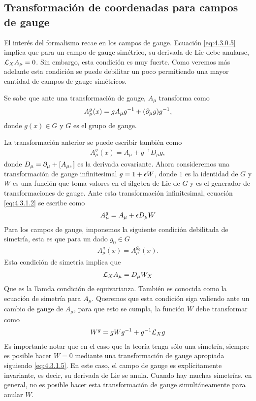 \subsection{Transformación de coordenadas para campos de gauge}

El interés del formalismo recae en los campos de gauge. Ecuación \eqref{eq:4.3.0.5} implica que para un campo de gauge simétrico, su derivada de Lie debe anularse, $\mathcal{L}_X A_\mu=0$. Sin embargo, esta condición es muy fuerte. Como veremos más adelante esta condición se puede debilitar un poco permitiendo una mayor cantidad de campos de gauge simétricos.

Se sabe que ante una transformación de gauge, $A_\mu$ transforma como
\begin{align}
	A^g_\mu(x) = gA_\mu g^{-1}+(\partial_\mu g)g^{-1}, \label{eq:4.3.1.1}
\end{align}
donde $g(x)\in G$ y $G$ es el grupo de gauge.

La transformación anterior se puede escribir también como
\begin{align}
	A^g_\mu(x) = A_\mu+g^{-1}D_\mu g, \label{eq:4.3.1.2}
\end{align}
donde $D_\mu=\partial_\mu+[A_\mu,]$ es la derivada covariante. Ahora consideremos una transformación de gauge infinitesimal $g=1+\epsilon W$, donde $1$ es la identidad de $G$ y $W$ es una función que toma valores en el álgebra de Lie de $G$ y es el generador de transformaciones de gauge. Ante esta transformación infinitesimal, ecuación \eqref{eq:4.3.1.2} se escribe como
\begin{align}
	A_\mu^g = A_\mu+\epsilon D_\mu W \label{eq:4.3.1.3}
\end{align}
Para los campos de gauge, imponemos la siguiente condición debilitada de simetría, esta es que para un dado $g_0\in G$ 
\begin{align}
	A^g_\mu(x)=A_\mu^{g_0}(x).
\end{align}
Esta condición de simetría implica que
\begin{align}
	\mathcal{L}_X A_\mu = D_\mu W_X \label{eq:4.3.1.4}
\end{align}
Que es la llamda condición de equivarianza. También es conocida como la ecuación de simetría para $A_\mu$. Queremos que esta condición siga valiendo ante un cambio de gauge de $A_\mu$, para que esto se cumpla, la función $W$ debe transformar como
\begin{align}
	W^g = gWg^{-1}+g^{-1}\mathcal{L}_Xg \label{eq:4.3.1.5}
\end{align}
Es importante notar que en el caso que la teoría tenga sólo una simetría, siempre es posible hacer $W=0$ mediante una transformación de gauge apropiada siguiendo \eqref{eq:4.3.1.5}. En este caso, el campo de gauge es explícitamente invariante, es decir, su derivada de Lie se anula. Cuando hay muchas simetrías, en general, no es posible hacer esta transformación de gauge simultáneamente para anular $W$.

